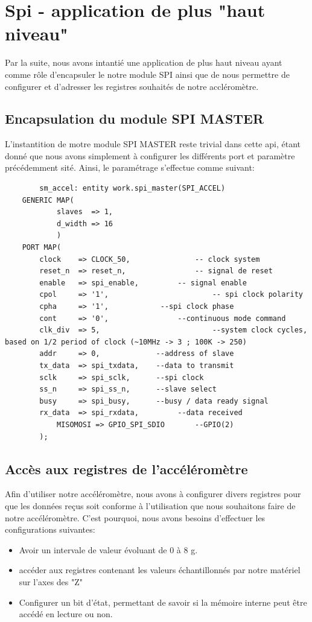 \documentclass[french,a4paper,12pt]{report}
\begin{document}
	\section{Spi - application de plus "haut niveau"}
		Par la suite, nous avons intantié une application de plus haut niveau ayant comme rôle d'encapsuler le notre module SPI ainsi que de nous permettre de configurer et d'adresser les registres souhaités de notre accléromètre.
		
		\subsection{Encapsulation du module SPI MASTER}
			L'instantition de motre module SPI MASTER reste trivial dans cette api, étant donné que nous avons simplement à configurer les différents port et paramètre précédemment sité. Ainsi, le paramétrage s'effectue comme suivant:

	\begin{lstlisting}
 		sm_accel: entity work.spi_master(SPI_ACCEL)
  	GENERIC MAP(
   	 		slaves  => 1,
   	 		d_width => 16
	 		)
  	PORT MAP(
    	clock    => CLOCK_50,				-- clock system
    	reset_n  => reset_n,				-- signal de reset
    	enable   => spi_enable,			-- signal enable
    	cpol     => '1',						-- spi clock polarity
    	cpha     => '1',           	--spi clock phase
    	cont     => '0',         		--continuous mode command
    	clk_div  => 5,							--system clock cycles, based on 1/2 period of clock (~10MHz -> 3 ; 100K -> 250)
    	addr     => 0,             --address of slave
    	tx_data  => spi_txdata,    --data to transmit
    	sclk     => spi_sclk,      --spi clock
    	ss_n     => spi_ss_n,      --slave select
    	busy     => spi_busy,      --busy / data ready signal
    	rx_data  => spi_rxdata,			--data received
	 		MISOMOSI => GPIO_SPI_SDIO		--GPIO(2)
		);
		\end{lstlisting}
		
		\subsection{Accès aux registres de l'accéléromètre}
			Afin d'utiliser notre accéléromètre, nous avons à configurer divers registres pour que les données reçus soit conforme à l'utilisation que nous souhaitons faire de notre accéléromètre. C'est pourquoi, nous avons besoins d'effectuer les configurations suivantes:
			
			\begin{itemize}
				\item Avoir un intervale de valeur évoluant de 0 à 8 g.
				\item accéder aux registres contenant les valeurs échantillonnés par notre matériel sur l'axes des "Z"
				\item Configurer un bit d'état, permettant de savoir si la mémoire interne peut être accédé en lecture ou non.				
			\end{itemize}
			
\end{document}
